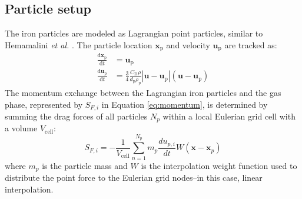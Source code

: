 \documentclass[times,twocolumn,final]{elsarticle}
\newcommand{\mrm}[1]{\mathrm{#1}}
\newcommand{\upd}{\mathrm{d}}                           %
\newcommand{\der}[2]{\frac{\upd #1}{\upd #2}}           %
\begin{document}
{\subsection{Particle setup\label{sec:particle}}

The iron particles are modeled as Lagrangian point particles, similar to Hemamalini \emph{et al.} \cite{Hemamalini2024}. The particle location $\mathbf{x}_{\mathrm{p}}$ and velocity $\mathbf{u}_{\mathrm{p}}$ are tracked as:
\begin{equation}
\begin{split}
    \der{\mathbf{x}_{\mathrm{p}}}{t} &= \mathbf{u}_{\mathrm{p}}\\
    \der{\mathbf{u}_{\mathrm{p}}}{t} &= \frac{3}{4}\frac{C_\mrm{D} \rho}{d_\mathrm{p} \rho_\mathrm{p}}\left| \mathbf{u} - \mathbf{u}_{\mrm{p}} \right| \left( \mathbf{u} - \mathbf{u}_{\mathrm{p}} \right) 
\end{split}\label{eq:particledrag}
\end{equation}
The momentum exchange between the Lagrangian iron particles and the gas phase, represented by $S_{F,i}$ in Equation \ref{eq:momentum}, is determined by summing the drag forces of all particles $N_p$ within a local Eulerian grid cell with a volume $V_{\mrm{cell}}$:
\begin{equation}
    S_{F,i} = -\frac{1}{V_{\mrm{cell}}} \sum_{n=1}^{N_p} m_p \frac{d u_{p,i}}{dt} W(\mathbf{x} - \mathbf{x}_p)
\end{equation}
where $m_p$ is the particle mass and $W$ is the interpolation weight function used to distribute the point force to the Eulerian grid nodes--in this case, linear interpolation. 

}
\end{document}
